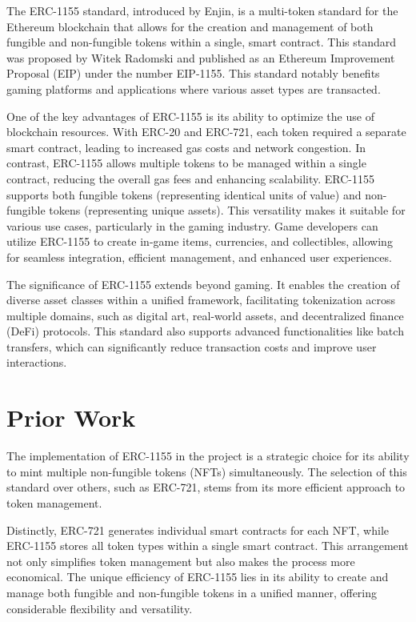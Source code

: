 \documentclass[10pt,twocolumn]{article}
\begin{document}
The ERC-1155 standard, introduced by Enjin, is a multi-token standard for the Ethereum blockchain that allows for the creation and management of both fungible and non-fungible tokens within a single, smart contract. This standard was proposed by Witek Radomski and published as an Ethereum Improvement Proposal (EIP) under the number EIP-1155. This standard notably benefits gaming platforms and applications where various asset types are transacted.\cite{erc115standered}

One of the key advantages of ERC-1155 is its ability to optimize the use of blockchain resources. With ERC-20 and ERC-721, each token required a separate smart contract, leading to increased gas costs and network congestion. In contrast, ERC-1155 allows multiple tokens to be managed within a single contract, reducing the overall gas fees and enhancing scalability. ERC-1155 supports both fungible tokens (representing identical units of value) and non-fungible tokens (representing unique assets). This versatility makes it suitable for various use cases, particularly in the gaming industry. Game developers can utilize ERC-1155 to create in-game items, currencies, and collectibles, allowing for seamless integration, efficient management, and enhanced user experiences.\cite{erc115standered}

The significance of ERC-1155 extends beyond gaming. It enables the creation of diverse asset classes within a unified framework, facilitating tokenization across multiple domains, such as digital art, real-world assets, and decentralized finance (DeFi) protocols. This standard also supports advanced functionalities like batch transfers, which can significantly reduce transaction costs and improve user interactions.
\section{Prior Work}
The implementation of ERC-1155 in the project is a strategic choice for its ability to mint multiple non-fungible tokens (NFTs) simultaneously. The selection of this standard over others, such as ERC-721, stems from its more efficient approach to token management.

Distinctly, ERC-721 generates individual smart contracts for each NFT, while ERC-1155 stores all token types within a single smart contract. This arrangement not only simplifies token management but also makes the process more economical. The unique efficiency of ERC-1155 lies in its ability to create and manage both fungible and non-fungible tokens in a unified manner, offering considerable flexibility and versatility.\cite{ERC-721_vs_ERC-1155}
\end{document}
